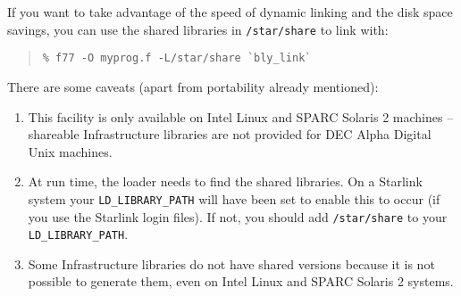 \documentclass[twoside,11pt]{article}
\begin{document}
If you want to take advantage of the speed of dynamic linking and the
disk space savings, you can use the shared libraries in \texttt{/star/share}
to link with:

\begin{quote}
\begin{verbatim}
% f77 -O myprog.f -L/star/share `bly_link`
\end{verbatim}
\end{quote}

There are some caveats (apart from portability already mentioned):

\begin{enumerate}

\item This facility is only available on Intel Linux and SPARC Solaris
2 machines -- shareable Infrastructure libraries are not provided for
DEC Alpha Digital Unix machines.

\item At run time, the loader needs to find the shared libraries.  On a
Starlink system your \texttt{LD\_LIBRARY\_PATH} will have been set to enable
this to occur (if you use the Starlink login files).  If not, you should
add \texttt{/star/share} to your \texttt{LD\_LIBRARY\_PATH}.

\item Some Infrastructure libraries do not have shared versions because
it is not possible to generate them, even on Intel Linux and SPARC Solaris 2
systems.

\end{enumerate}
\end{document}
